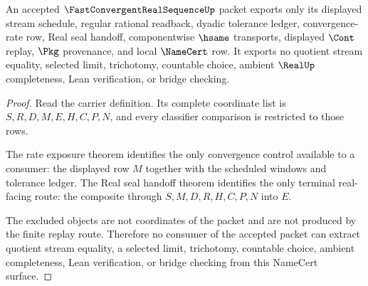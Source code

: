 \begin{theorem}
\label{thm:fast-convergent-real-sequence-nonescape}
An accepted $\FastConvergentRealSequenceUp$ packet exports only its displayed stream schedule, regular rational readback, dyadic tolerance ledger, convergence-rate row, Real seal handoff, componentwise $\hsame$ transports, displayed $\Cont$ replay, $\Pkg$ provenance, and local $\NameCert$ row. It exports no quotient stream equality, selected limit, trichotomy, countable choice, ambient $\RealUp$ completeness, Lean verification, or bridge checking.
\end{theorem}
\begin{proof}
Read the carrier definition. Its complete coordinate list is $S,R,D,M,E,H,C,P,N$, and every classifier comparison is restricted to those rows.

The rate exposure theorem identifies the only convergence control available to a consumer: the displayed row $M$ together with the scheduled windows and tolerance ledger. The Real seal handoff theorem identifies the only terminal real-facing route: the composite through $S,M,D,R,H,C,P,N$ into $E$.

The excluded objects are not coordinates of the packet and are not produced by the finite replay route. Therefore no consumer of the accepted packet can extract quotient stream equality, a selected limit, trichotomy, countable choice, ambient completeness, Lean verification, or bridge checking from this NameCert surface.
\end{proof}


\begin{closurestatus}{\FastConvergentRealSequenceUp}
  \theoryclosure{\seedClosure}
  \formalstatus{\unformalizedV}
\end{closurestatus}
